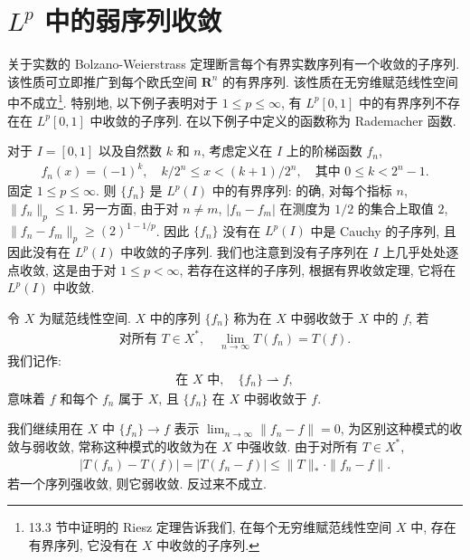 \documentclass[../../main.tex]{subfiles}
\begin{document}
\section{$L^{p}$ 中的弱序列收敛}\label{section:ch08-弱序列收敛}

关于实数的 Bolzano-Weierstrass 定理断言每个有界实数序列有一个收敛的子序列. 该性质可立即推广到每个欧氏空间 $\mathbf{R}^{n}$ 的有界序列. 该性质在无穷维赋范线性空间中不成立\footnote{13.3 节中证明的 Riesz 定理告诉我们, 在每个无穷维赋范线性空间 $X$ 中, 存在有界序列, 它没有在 $X$ 中收敛的子序列.}. 特别地, 以下例子表明对于 $1\leqslant p\leqslant\infty$, 有 $L^{p}[0,1]$ 中的有界序列不存在在 $L^{p}[0,1]$ 中收敛的子序列. 在以下例子中定义的函数称为 Rademacher 函数.

\begin{example}\label{example:ch08-Rademacher}
对于 $I=[0,1]$ 以及自然数 $k$ 和 $n$, 考虑定义在 $I$ 上的阶梯函数 $f_{n}$,
\begin{align*}
f_{n}(x)=(-1)^{k},\quad k/2^{n}\leqslant x<(k+1)/2^{n},\quad\text{其中 }0\leqslant k<2^{n}-1.
\end{align*}
固定 $1\leqslant p\leqslant\infty$. 则 $\{f_{n}\}$ 是 $L^{p}(I)$ 中的有界序列: 的确, 对每个指标 $n$, $\|f_{n}\|_{p}\leqslant 1$. 另一方面, 由于对 $n\neq m$, $|f_{n}-f_{m}|$ 在测度为 $1/2$ 的集合上取值 $2$, $\|f_{n}-f_{m}\|_{p}\geqslant(2)^{1-1/p}$. 因此 $\{f_{n}\}$ 没有在 $L^{p}(I)$ 中是 Cauchy 的子序列, 且因此没有在 $L^{p}(I)$ 中收敛的子序列. 我们也注意到没有子序列在 $I$ 上几乎处处逐点收敛, 这是由于对 $1\leqslant p<\infty$, 若存在这样的子序列, 根据有界收敛定理, 它将在 $L^{p}(I)$ 中收敛.
\end{example}

\begin{definition}[弱收敛]\label{definition:ch08-弱收敛}
令 $X$ 为赋范线性空间. $X$ 中的序列 $\{f_{n}\}$ 称为在 $X$ 中弱收敛于 $X$ 中的 $f$, 若
\begin{align*}
\text{对所有 }T\in X^{*},\quad\lim_{n\to\infty}T(f_{n})=T(f).
\end{align*}
我们记作:
\begin{align*}
\text{在 }X\text{ 中},\quad\{f_{n}\}\rightharpoonup f,
\end{align*}
意味着 $f$ 和每个 $f_{n}$ 属于 $X$, 且 $\{f_{n}\}$ 在 $X$ 中弱收敛于 $f$.
\end{definition}

我们继续用在 $X$ 中 $\{f_{n}\}\to f$ 表示 $\lim_{n\to\infty}\|f_{n}-f\|=0$, 为区别这种模式的收敛与弱收敛, 常称这种模式的收敛为在 $X$ 中强收敛. 由于对所有 $T\in X^{*}$,
\begin{align*}
|T(f_{n})-T(f)|=|T(f_{n}-f)|\leqslant\|T\|_{*}\cdot\|f_{n}-f\|.
\end{align*}
若一个序列强收敛, 则它弱收敛. 反过来不成立.
\end{document}

